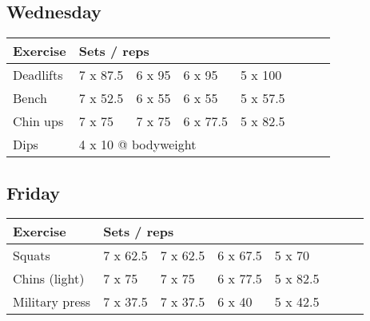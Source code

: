 \documentclass[12pt, a4paper]{article}%
\begin{document}
  \subsection*{\hspace{0.5em} Wednesday }


  \begin{tabular}{l|lllllll}
  \hspace{0.75em} \textbf{Exercise} & \multicolumn{ 7 }{l}{ \textbf{Sets / reps} } \\ \hline

            \hspace{0.75em} Deadlifts
            & 7 x 87.5
            & 6 x 95
            & 6 x 95
            & 5 x 100
            & 
            & 
            & 
            \\


            \hspace{0.75em} Bench
            & 7 x 52.5
            & 6 x 55
            & 6 x 55
            & 5 x 57.5
            & 
            & 
            & 
            \\


            \hspace{0.75em} Chin ups
            & 7 x 75
            & 7 x 75
            & 6 x 77.5
            & 5 x 82.5
            & 
            & 
            & 
            \\


   \hspace{0.75em} Dips &  \multicolumn{ 7 }{l}{ 4 x 10 @ bodyweight } \\
  \end{tabular}

  \subsection*{\hspace{0.5em} Friday }


  \begin{tabular}{l|lllllll}
  \hspace{0.75em} \textbf{Exercise} & \multicolumn{ 7 }{l}{ \textbf{Sets / reps} } \\ \hline

            \hspace{0.75em} Squats
            & 7 x 62.5
            & 7 x 62.5
            & 6 x 67.5
            & 5 x 70
            & 
            & 
            & 
            \\


            \hspace{0.75em} Chins (light)
            & 7 x 75
            & 7 x 75
            & 6 x 77.5
            & 5 x 82.5
            & 
            & 
            & 
            \\


            \hspace{0.75em} Military press
            & 7 x 37.5
            & 7 x 37.5
            & 6 x 40
            & 5 x 42.5
            & 
            & 
            & 
            \\


  \end{tabular}
\end{document}
